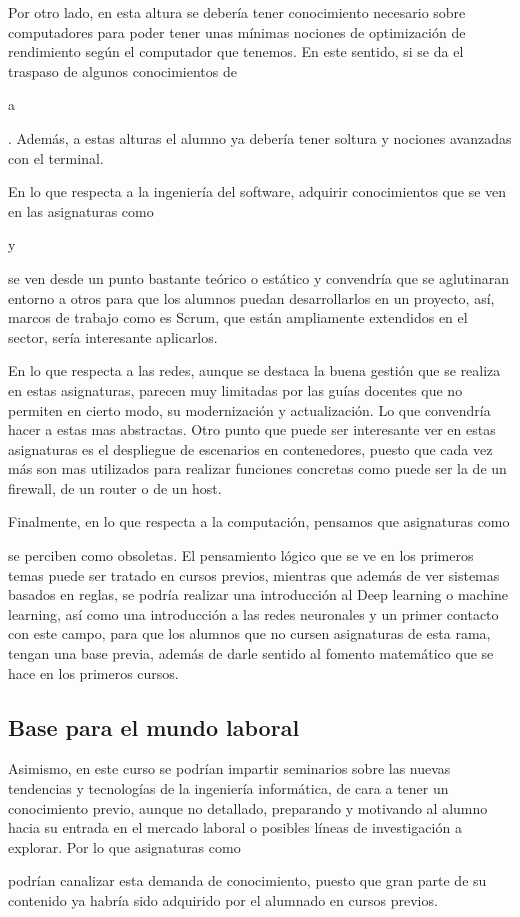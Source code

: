 Por otro lado, en esta altura se debería tener conocimiento necesario sobre computadores para poder tener unas mínimas nociones de optimización de rendimiento según el computador que tenemos. En este sentido, si se da el traspaso de algunos conocimientos de \subject{Arquitectura y organización de computadores} a \subject{Ampliación de estructura de computadores}. Además, a estas alturas el alumno ya debería tener soltura y nociones avanzadas con el terminal.

En lo que respecta a la ingeniería del software, adquirir conocimientos que se ven en las asignaturas como \subject{Procesos de desarrollo Software} y \subject{Gestión de Proyectos de Desarrollo de Software} se ven desde un punto bastante teórico o estático y convendría que se aglutinaran entorno a otros para que los alumnos puedan desarrollarlos en un proyecto, así, marcos de trabajo como es Scrum, que están ampliamente extendidos en el sector, sería interesante aplicarlos.

En lo que respecta a las redes, aunque se destaca la buena gestión que se realiza en estas asignaturas, parecen muy limitadas por las guías docentes que no permiten en cierto modo, su modernización y actualización. Lo que convendría hacer a estas mas abstractas. Otro punto que puede ser interesante ver en estas asignaturas es el despliegue de escenarios en contenedores, puesto que cada vez más son mas utilizados para realizar funciones concretas como puede ser la de un firewall, de un router o de un host.

Finalmente, en lo que respecta a la computación, pensamos que asignaturas como \subject{Sistemas inteligentes} se perciben como obsoletas. El pensamiento lógico que se ve en los primeros temas puede ser tratado en cursos previos, mientras que además de ver sistemas basados en reglas, se podría realizar una introducción al Deep learning o machine learning, así como una introducción a las redes neuronales y un primer contacto con este campo, para que los alumnos que no cursen asignaturas de esta rama, tengan una base previa, además de darle sentido al fomento matemático que se hace en los primeros cursos.


\subsection{Base para el mundo laboral}
Asimismo, en este curso se podrían impartir seminarios sobre las nuevas tendencias y tecnologías de la ingeniería informática, de cara a tener un conocimiento previo, aunque no detallado, preparando y motivando al alumno hacia su entrada en el mercado laboral o posibles líneas de investigación a explorar. Por lo que asignaturas como \subject{Tecnologías específicas de la ingeniería informática (TFII)} podrían canalizar esta demanda de conocimiento, puesto que gran parte de su contenido ya habría sido adquirido por el alumnado en cursos previos.

